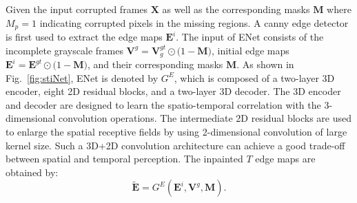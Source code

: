 Given the input corrupted frames $\boldsymbol{X}$ as well as the corresponding masks $\boldsymbol{M}$ where $M_p=1$ indicating corrupted pixels in  the missing regions. 
%
A canny edge detector is first used to extract the edge maps $\boldsymbol{E}^{i}$. %
The input of ENet consists of the incomplete grayscale frames $\boldsymbol{V}^{g}=\boldsymbol{V}_{g}^{gt}\odot\big(1-\boldsymbol{M}\big)$, initial edge maps $\boldsymbol{E}^{i}=\boldsymbol{E}^{gt}\odot\big(1-\boldsymbol{M}\big)$, and their corresponding masks $\boldsymbol{M}$.
%
As shown in Fig.~\ref{fig:stiNet}, ENet is denoted by $G^E$, which is composed of a two-layer 3D encoder, eight 2D residual blocks, and a two-layer 3D decoder. 
The 3D encoder and decoder are designed to learn the spatio-temporal correlation with the 3-dimensional convolution operations.
The intermediate 2D residual blocks are used to enlarge the spatial receptive fields by using 2-dimensional convolution of large kernel size.
Such a 3D+2D convolution architecture can achieve a good trade-off between spatial and temporal perception.
The inpainted $T$ edge maps are obtained by:
\begin{equation}
	\label{eq:edgenet}
	\boldsymbol{\widetilde{E}}=G^E(\boldsymbol{E}^{i},\boldsymbol{V}^{g},\boldsymbol{M}).
\end{equation}

